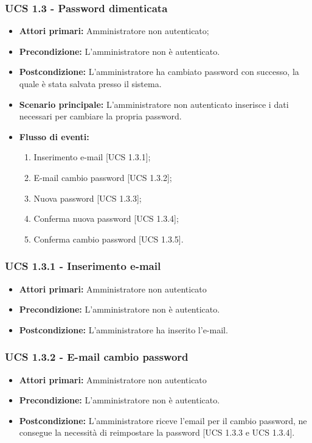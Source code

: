 \subsubsection{UCS 1.3 - Password dimenticata}%
\begin{itemize}
\item \textbf{Attori primari:} Amministratore non autenticato;
\item \textbf{Precondizione:}  L'amministratore non è autenticato.
\item \textbf{Postcondizione:} L'amministratore ha cambiato password con successo, la quale è stata salvata presso il sistema.
\item \textbf{Scenario principale:} L'amministratore non autenticato inserisce i dati necessari per cambiare la propria password.
\item \textbf{Flusso di eventi:}
    \begin{enumerate}
        \item Inserimento e-mail [UCS 1.3.1];
        \item E-mail cambio password [UCS 1.3.2];
        \item Nuova password [UCS 1.3.3];
        \item Conferma nuova password [UCS 1.3.4];
        \item Conferma cambio password [UCS 1.3.5].
    \end{enumerate}
\end{itemize}

\subsubsection{UCS 1.3.1 - Inserimento e-mail}
\begin{itemize}
\item \textbf{Attori primari:} Amministratore non autenticato
\item \textbf{Precondizione:} L'amministratore non è autenticato. %
\item \textbf{Postcondizione:} L'amministratore ha inserito l'e-mail.
\end{itemize}

\subsubsection{UCS 1.3.2 - E-mail cambio password}
\begin{itemize}
\item \textbf{Attori primari:} Amministratore non autenticato
\item \textbf{Precondizione:} L'amministratore non è autenticato.
\item \textbf{Postcondizione:} L'amministratore riceve l'email per il cambio password, ne consegue la necessità di reimpostare la password [UCS 1.3.3 e UCS 1.3.4].
\end{itemize}


